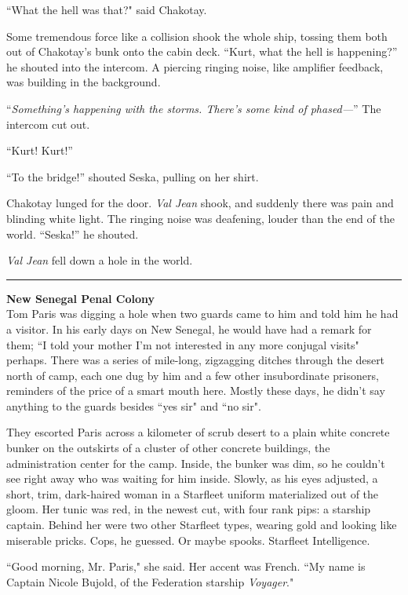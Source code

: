 \documentclass[twoside,letterpaper,12pt]{memoir}
\begin{document}
``What the hell was that?" said Chakotay.

Some tremendous force like a collision shook the whole ship, tossing them both out of Chakotay's bunk onto the cabin deck. ``Kurt, what the hell is happening?'' he shouted into the intercom. A piercing ringing noise, like amplifier feedback, was building in the background.

``\textit{Something's happening with the storms. There's some kind of phased---}'' The intercom cut out.

``Kurt! Kurt!''

``To the bridge!'' shouted Seska, pulling on her shirt.

Chakotay lunged for the door. \textit{Val Jean} shook, and suddenly there was pain and blinding white light. The ringing noise was deafening, louder than the end of the world. ``Seska!'' he shouted.

\textit{Val Jean} fell down a hole in the world.

\begin{center}\rule{3cm}{0.4 pt}\end{center}

\noindent\textbf{New Senegal Penal Colony}\\

Tom Paris was digging a hole when two guards came to him and told him he had a visitor. In his early days on New Senegal, he would have had a remark for them; ``I told your mother I'm not interested in any more conjugal visits" perhaps. There was a series of mile-long, zigzagging ditches through the desert north of camp, each one dug by him and a few other insubordinate prisoners, reminders of the price of a smart mouth here. Mostly these days, he didn't say anything to the guards besides ``yes sir" and ``no sir".

They escorted Paris across a kilometer of scrub desert to a plain white concrete bunker on the outskirts of a cluster of other concrete buildings, the administration center for the camp. Inside, the bunker was dim, so he couldn't see right away who was waiting for him inside. Slowly, as his eyes adjusted, a short, trim, dark-haired woman in a Starfleet uniform materialized out of the gloom. Her tunic was red, in the newest cut, with four rank pips: a starship captain. Behind her were two other Starfleet types, wearing gold and looking like miserable pricks. Cops, he guessed. Or maybe spooks. Starfleet Intelligence.

``Good morning, Mr. Paris," she said. Her accent was French. ``My name is Captain Nicole Bujold, of the Federation starship \textit{Voyager}."
\end{document}
